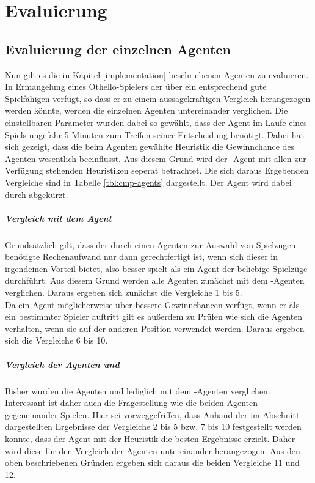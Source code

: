 \chapter{Evaluierung}
\section{Evaluierung der einzelnen Agenten}
Nun gilt es die in Kapitel \ref{implementation} beschriebenen Agenten zu evaluieren. In Ermangelung eines Othello-Spielers der über ein entsprechend gute Spielfähigen verfügt, so dass er zu einem aussagekräftigen Vergleich herangezogen werden könnte, werden die einzelnen Agenten untereinander verglichen. Die einstellbaren Parameter wurden dabei so gewählt, dass der Agent im Laufe eines Spiels ungefähr 5 Minuten zum Treffen seiner Entscheidung benötigt. Dabei hat sich gezeigt, dass die beim Agenten  gewählte Heuristik die Gewinnchance des Agenten wesentlich beeinflusst. Aus diesem Grund wird der -Agent mit allen zur Verfügung stehenden Heuristiken seperat betrachtet. Die sich daraus Ergebenden Vergleiche sind in Tabelle \ref{tbl:cmp-agents} dargestellt. Der Agent  wird dabei durch  abgekürzt.
\paragraph{Vergleich mit dem Agent }
Grundsätzlich gilt, dass der durch einen Agenten zur Auswahl von Spielzügen benötigte Rechenaufwand nur dann gerechtfertigt ist, wenn sich dieser in irgendeinen Vorteil bietet, also besser spielt als ein Agent der beliebige Spielzüge durchführt. Aus diesem Grund werden alle Agenten zunächst mit dem -Agenten verglichen. Daraus ergeben sich zunächst die Vergleiche 1 bis 5.
\\Da ein Agent möglicherweise über bessere Gewinnchancen verfügt, wenn er als ein bestimmter Spieler auftritt gilt es außerdem zu Prüfen wie sich die Agenten verhalten, wenn sie auf der anderen Position verwendet werden. Daraus ergeben sich die Vergleiche 6 bis 10. 

\paragraph{Vergleich der Agenten  und }
Bisher wurden die Agenten  und  lediglich mit dem -Agenten verglichen. Interessant ist daher auch die Fragestellung wie die beiden Agenten gegeneinander Spielen. Hier sei vorweggefriffen, dass Anhand der im Abschnitt  dargestellten Ergebnisse der Vergleiche 2 bis 5 bzw. 7 bis 10 festgestellt werden konnte, dass der Agent  mit der Heuristik   die besten Ergebnisse erzielt. Daher wird diese für den Vergleich der Agenten untereinander herangezogen. Aus den oben beschriebenen Gründen ergeben sich daraus die beiden Vergleiche 11 und 12.

